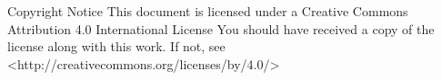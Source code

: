 \begin{flushleft}
Copyright Notice
\newline
\newline
This document is licensed under a Creative Commons Attribution 4.0 International License
\newline
\newline
You should have received a copy of the license along with this work. If not, see <http://creativecommons.org/licenses/by/4.0/>
\end{flushleft}
